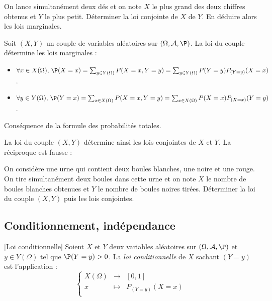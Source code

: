 \documentclass[french,11pt,twoside]{VcCours}
\begin{document}
\begin{Exemple}{} On lance simultanément deux dés et on note $X$ le plus grand des deux chiffres obtenus et $Y$ le plus petit. Déterminer la loi conjointe de $X$ de $Y$. En déduire alors les lois marginales.

\vspace{10cm}
\end{Exemple}

\begin{Proposition}{} Soit $(X,Y)$ un couple de variables aléatoires sur $(\Omega, \mathcal{A}, \P)$.  La loi du couple détermine les lois marginales :

\begin{itemize}
\item $\forall x \in X(\Omega), \, \P(X=x) = \sum_{y \in Y(\Omega)} P(X=x, Y=y) = \sum_{y \in Y(\Omega)} P(Y=y)P_{(Y=y)}(X=x)$.
\item $\forall y \in Y(\Omega), \, \P(Y=x) = \sum_{x \in X(\Omega)} P(X=x, Y=y) = \sum_{x \in X(\Omega)} P(X=x)P_{(X=x)}(Y=y)$.
\end{itemize}
\end{Proposition}

\begin{Demonstration}{} Conséquence de la formule des probabilités totales.
%
\end{Demonstration}
\medskip

\begin{Remarque}[\alerte]{} La loi du couple $(X,Y)$ détermine ainsi les lois conjointes de $X$ et $Y$. La réciproque est fausse :

\vspace{5cm}
\end{Remarque}

\begin{ApplicationDirecte}{} On considère une urne qui contient deux boules blanches, une noire et une rouge. On tire simultanément deux boules dans cette urne et on note $X$ le nombre de boules blanches obtenues et $Y$ le nombre de boules noires tirées. Déterminer la loi du couple $(X,Y)$ puis les lois conjointes.
\end{ApplicationDirecte}
\subsection{Conditionnement, indépendance}

\begin{Definition}{}[Loi conditionnelle] Soient $X$ et $Y$ deux variables aléatoires sur $(\Omega, \mathcal{A}, \P)$ et $y \in Y(\Omega)$ tel que $\P(Y=y)>0$. La \emph{loi conditionnelle} de $X$ sachant $(Y=y)$ est l'application :
$$ \left\lbrace \begin{array}{ccl}
X(\Omega) & \longrightarrow & [0,1] \\
x & \longmapsto & P_{(Y=y)}(X=x) \\
\end{array}\right.$$
\end{Definition}
\end{document}
